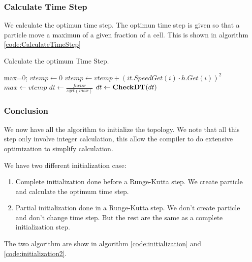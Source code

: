 \subsubsection{Calculate Time Step}

We calculate the optimun time step.
The optimun time step is given so that a particle move a maximun of a given fraction of a cell.
This is shown in algorithm \ref{code:CalculateTimeStep}
\begin{algorithm}
\caption{Calculate the optimum Time Step.}
\label{code:CalculateTimeStep}
\begin{algorithmic}[1]
max=0;
				\State $vtemp\gets 0$
					\State $vtemp\gets vtemp+(it.SpeedGet(i)\cdot h.Get(i))^2$
				\EndFor
					\State $max \gets vtemp$
				\EndIf
			\EndIf
	\EndFor
        \State $dt \gets \frac{factor}{sqrt(max)}$ 
	\State $dt \gets \mathop{\textbf{CheckDT}}(dt)$ 
\EndProcedure
\end{algorithmic}
\end{algorithm}

\subsubsection{Conclusion}

We now have all the algorithm to initialize the topology.
We note that all this step only involve integer calculation, this allow the compiler to do extensive optimization
to simplify calculation.

We have two different initialization case:
\begin{enumerate}
 \item Complete initialization done before a Runge-Kutta step. We create particle and calculate the optimum time step.
 \item Partial initialization done in a Runge-Kutta step. We don't create particle and don't change time step.
 But the rest are the same as a complete initialization step.
\end{enumerate}
The two algorithm are show in algorithm \ref{code:initialization} and \ref{code:initialization2}.


